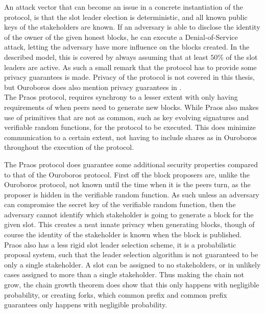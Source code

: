 An attack vector that can become an issue in a concrete instantiation of the protocol, is that the slot leader election is deterministic, and all known public keys of the stakeholders are known. If an adversary is able to disclose the identity of the owner of the given honest blocks, he can execute a Denial-of-Service attack, letting the adversary have more influence on the blocks created. In the described model, this is covered by always assuming that at least $50\%$ of the slot leaders are active. As such a small remark that the protocol has to provide some privacy guarantees is made. Privacy of the protocol is not covered in this thesis, but Ouroboros does also mention privacy guarantees in \cite{ouroboros}. \\


The Praos protocol, requires synchrony to a lesser extent with only having requirements of when peers need to generate new blocks. While Praos also makes use of primitives that are not as common, such as key evolving signatures and verifiable random functions, for the protocol to be executed. This does minimize communication to a certain extent, not having to include shares as in Ouroboros throughout the execution of the protocol.

The Praos protocol does guarantee some additional security properties compared to that of the Ouroboros protocol. First off the block proposers are, unlike the Ouroboros protocol, not known until the time when it is the peers turn, as the proposer is hidden in the verifiable random function. As such unless an adversary can compromise the secret key of the verifiable random function, then the adversary cannot identify which stakeholder is going to generate a block for the given slot. This creates a neat innate privacy when generating blocks, though of course the identity of the stakeholder is known when the block is published. Praos also has a less rigid slot leader selection scheme, it is a probabilistic proposal system, such that the leader selection algorithm is not guaranteed to be only a single stakeholder. A slot can be assigned to no stakeholders, or in unlikely cases assigned to more than a single stakeholder. Thus making the chain not grow, the chain growth theorem does show that this only happens with negligible probability, or creating forks, which common prefix and common prefix guarantees only happens with negligible probability.


